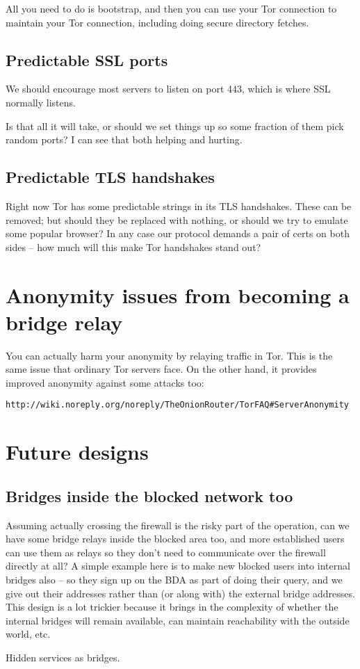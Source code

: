 \documentclass{llncs}
\begin{document}
All you need to do is bootstrap, and then you can use
your Tor connection to maintain your Tor connection,
including doing secure directory fetches.

\subsection{Predictable SSL ports}

We should encourage most servers to listen on port 443, which is
where SSL normally listens.

Is that all it will take, or should we set things up so some fraction
of them pick random ports? I can see that both helping and hurting.

\subsection{Predictable TLS handshakes}

Right now Tor has some predictable strings in its TLS handshakes.
These can be removed; but should they be replaced with nothing, or
should we try to emulate some popular browser? In any case our
protocol demands a pair of certs on both sides -- how much will this
make Tor handshakes stand out?

\section{Anonymity issues from becoming a bridge relay}

You can actually harm your anonymity by relaying traffic in Tor.  This is
the same issue that ordinary Tor servers face. On the other hand, it
provides improved anonymity against some attacks too:

\begin{verbatim}
http://wiki.noreply.org/noreply/TheOnionRouter/TorFAQ#ServerAnonymity
\end{verbatim}

\section{Future designs}

\subsection{Bridges inside the blocked network too}

Assuming actually crossing the firewall is the risky part of the
operation, can we have some bridge relays inside the blocked area too,
and more established users can use them as relays so they don't need to
communicate over the firewall directly at all? A simple example here is
to make new blocked users into internal bridges also -- so they sign up
on the BDA as part of doing their query, and we give out their addresses
rather than (or along with) the external bridge addresses. This design
is a lot trickier because it brings in the complexity of whether the
internal bridges will remain available, can maintain reachability with
the outside world, etc.

Hidden services as bridges.

% 
\end{document}
